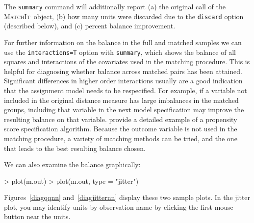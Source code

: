 \documentclass[oneside,letterpaper,titlepage]{article}
\newcommand{\MatchIt}{\textsc{MatchIt}}
\begin{document}
\begin{enumerate}
The \texttt{summary} command will additionally report (a) the original
call of the \MatchIt\ object, (b) how many units were discarded due
to the \texttt{discard} option (described below), and (c) percent
balance improvement.  

For further information on the balance in the full and matched samples
we can use the {\tt interactions=T} option with {\tt summary}, which
shows the balance of all squares and interactions of the covariates
used in the matching procedure.  This is helpful for diagnosing
whether balance across matched pairs has been attained.  Significant
differences in higher order interactions usually are a good indication
that the assignment model needs to be respecified. For example, if a variable
not included in the original distance measure has large imbalances in the matched groups, including
that variable in the next model specification may improve the resulting balance on that variable.  \cite{DehWah99} provide
a detailed example of a propensity score specification algorithm.   Because the outcome variable is not used
in the matching procedure, a variety of matching methods can be tried, and the one that leads to the best resulting balance
chosen.


We can also examine the balance graphically:
\begin{Schunk}
\begin{Sinput}
> plot(m.out)
> plot(m.out, type = "jitter")
\end{Sinput}
\end{Schunk}

Figures~\ref{diagqqnn} and~\ref{diagjitternn} display these two sample
plots.  In the jitter plot, you may identify units by observation name
by clicking the first mouse button near the units.  


\end{enumerate}
\end{document}
